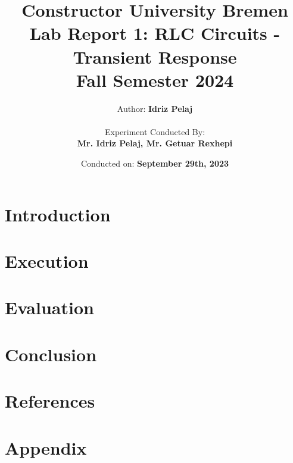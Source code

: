 \documentclass[12pt]{report}
\title{
    \textbf{Constructor University Bremen} \\
    \vspace{1cm}
    \textbf{Lab Report 1: RLC Circuits - Transient Response} \\ 
    Fall Semester 2024 \\
}
\author{
    Author: \textbf{Idriz Pelaj} \\
    \vspace{1cm} \\
    Experiment Conducted By: \\ \textbf{Mr. Idriz Pelaj, Mr. Getuar Rexhepi}
}
\date{Conducted on: \textbf{September 29th, 2023}}
\begin{document}
\maketitle

\chapter{Introduction}
\vspace{-1cm}


\chapter{Execution}
\vspace{-1cm}


\chapter{Evaluation}
\vspace{-1cm}


\chapter{Conclusion}
\vspace{-1cm}


\chapter{References}
\vspace{-1cm}


\chapter{Appendix}
\vspace{-1cm}

\end{document}
